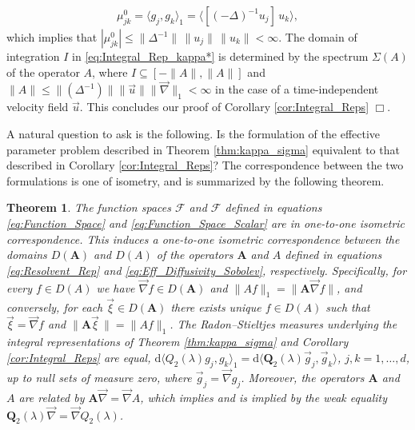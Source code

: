 \documentclass[11pt]{amsart}
\renewcommand{\d}{\mathrm{d}}
\newcommand{\Ab}{\mathbf{A}}
\newcommand{\Qb}{\mathbf{Q}}
\newcommand{\Fc}{\mathcal{F}}
\newcommand{\Fs}{\mathscr{F}}
\newtheorem{theorem}{Theorem}[section]
\begin{document}
% 
\begin{align}\label{eq:Mass_Scalar}
  \mu^0_{jk}
        =\langle g_j,g_k\rangle_1
        =\langle[(-\Delta)^{-1}u_j]\,u_k\rangle,   
\end{align}
%
which implies that
$|\mu^0_{jk}|\leq\|\Delta^{-1}\|\,\|u_j\|\,\|u_k\|<\infty$.  The
domain of integration $I$ in \eqref{eq:Integral_Rep_kappa*} is
determined by the spectrum $\Sigma(A)$ of the operator $A$, where
$I\subseteq[-\|A\|,\|A\|]$ and $\|A\|\leq\|(\Delta^{-1})\|\|\vec{u}\|\|\vec{\nabla}\|_1<\infty$ in the case of a
time-independent velocity field $\vec{u}$. This concludes our proof of
Corollary \ref{cor:Integral_Reps} $\Box$.  




A natural question to ask is the following. Is the formulation of the
effective parameter problem described in Theorem \ref{thm:kappa_sigma}
equivalent to that described in Corollary \ref{cor:Integral_Reps}?
The correspondence between the two formulations is one of isometry,
and is summarized by the following theorem. 
%
\begin{theorem}\label{thm:Formulation_Equivalence}
%  
The function spaces $\Fs$ and $\Fc$ defined in equations
\eqref{eq:Function_Space} and \eqref{eq:Function_Space_Scalar} are in
one-to-one isometric correspondence. This induces a one-to-one
isometric correspondence between the domains $D(\Ab)$ and $D(A)$ of
the operators $\Ab$ and $A$ defined in equations
\eqref{eq:Resolvent_Rep} and \eqref{eq:Eff_Diffusivity_Sobolev},
respectively. Specifically, for every $f\in D(A)$ we have
$\vec{\nabla}f\in D(\Ab)$ and $\|Af\|_1=\|\Ab\vec{\nabla}f\|$, and conversely, for each
$\vec{\xi}\in D(\Ab)$ there exists unique $f\in D(A)$ such that
$\vec{\xi}=\vec{\nabla}f$  and $\|\Ab\vec{\xi}\,\|=\|Af\|_1$. The Radon--Stieltjes
measures underlying the integral representations of Theorem
\ref{thm:kappa_sigma} and Corollary \ref{cor:Integral_Reps} are equal,
$\d\langle Q_2(\lambda)g_j,g_k\rangle_1=\d\langle\Qb_2(\lambda)\vec{g}_j,\vec{g}_k\rangle$, $j,k=1,\ldots,d$,
up to null sets of measure zero, where
$\vec{g}_j=\vec{\nabla}g_j$. Moreover, the operators $\Ab$ and $A$ are
related by $\Ab\vec{\nabla}=\vec{\nabla}A$, which implies and is implied by the
weak equality $\Qb_2(\lambda)\vec{\nabla}=\vec{\nabla}Q_2(\lambda)$.
%
\end{theorem}
%
\end{document}
